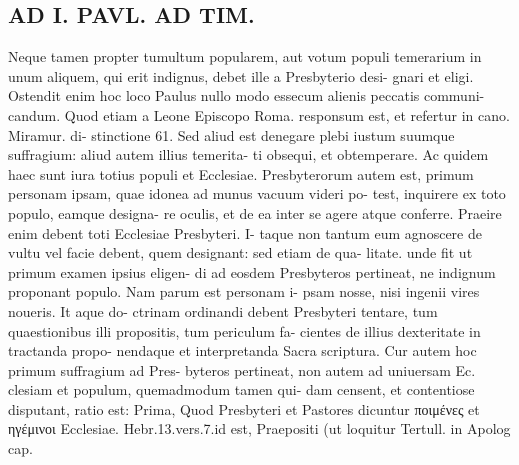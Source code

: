 \documentclass{article}
\begin{document}
\begin{pages}
\section*{AD I. PAVL. AD TIM. }
\marginpar{[ p.552 ]}Neque tamen propter tumultum popularem, aut votum populi temerarium in unum aliquem, qui erit indignus, debet ille a Presbyterio desi- gnari et eligi. Ostendit enim hoc loco Paulus nullo modo essecum alienis peccatis communi- candum. Quod etiam a Leone Episcopo Roma. responsum est, et refertur in cano. Miramur. di- stinctione 61. Sed aliud est denegare plebi iustum suumque suffragium: aliud autem illius temerita- ti obsequi, et obtemperare. Ac quidem haec sunt iura totius populi et Ecclesiae. Presbyterorum autem est, primum personam ipsam, quae idonea ad munus vacuum videri po- test, inquirere ex toto populo, eamque designa- re oculis, et de ea inter se agere atque conferre. Praeire enim debent toti Ecclesiae Presbyteri. I- taque non tantum eum agnoscere de vultu vel facie debent, quem designant: sed etiam de qua- litate. unde fit ut primum examen ipsius eligen- di ad eosdem Presbyteros pertineat, ne indignum proponant populo. Nam parum est personam i- psam nosse, nisi ingenii vires noueris. It aque do- ctrinam ordinandi debent Presbyteri tentare, tum quaestionibus illi propositis, tum periculum fa- cientes de illius dexteritate in tractanda propo- nendaque et interpretanda Sacra scriptura. Cur autem hoc primum suffragium ad Pres- byteros pertineat, non autem ad uniuersam Ec. clesiam et populum, quemadmodum tamen qui- dam censent, et contentiose disputant, ratio est: Prima, Quod Presbyteri et Pastores dicuntur ποιμένες et ηγέμινοι Ecclesiae. Hebr.13.vers.7.id est, Praepositi (ut loquitur Tertull. in Apolog cap. 

\end{pages}
\end{document}
